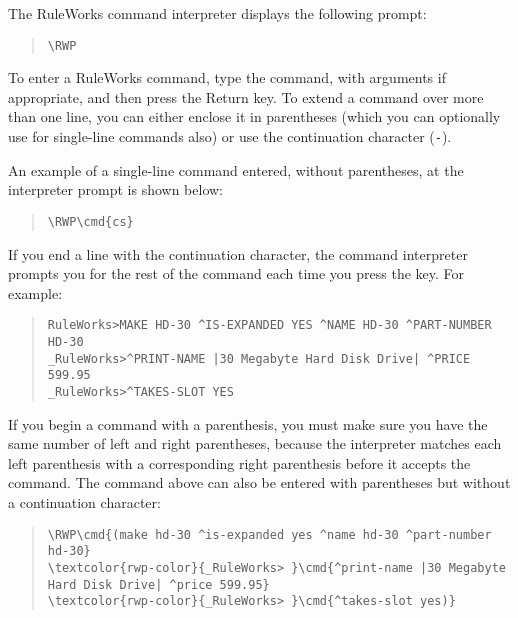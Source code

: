 The RuleWorks command interpreter displays the following prompt:

\begin{quote}
\begin{Verbatim}[commandchars=\\\{\}]
\RWP
\end{Verbatim}
\end{quote}

To enter a RuleWorks command, type the command, with arguments if
appropriate, and then press the Return key. To extend a command over
more than one line, you can either enclose it in parentheses (which
you can optionally use for single-line commands also) or use the
continuation character (\verb|-|).

An example of a single-line command entered, without parentheses, at
the interpreter prompt is shown below:

\begin{quote}
\begin{Verbatim}[commandchars=\\\{\}]
\RWP\cmd{cs}
\end{Verbatim}
\end{quote}

If you end a line with the continuation character, the command
interpreter prompts you for the rest of the command each time you
press the  key. For example:

\begin{quote}
\begin{verbatim}
RuleWorks>MAKE HD-30 ^IS-EXPANDED YES ^NAME HD-30 ^PART-NUMBER HD-30
_RuleWorks>^PRINT-NAME |30 Megabyte Hard Disk Drive| ^PRICE 599.95
_RuleWorks>^TAKES-SLOT YES
\end{verbatim}
\end{quote}

If you begin a command with a parenthesis, you must make sure you have
the same number of left and right parentheses, because the interpreter
matches each left parenthesis with a corresponding right parenthesis
before it accepts the command.  The  command above can also
be entered with parentheses but without a continuation character:

\begin{quote}
\begin{Verbatim}[commandchars=\\\{\}]
\RWP\cmd{(make hd-30 ^is-expanded yes ^name hd-30 ^part-number hd-30}
\textcolor{rwp-color}{_RuleWorks> }\cmd{^print-name |30 Megabyte Hard Disk Drive| ^price 599.95}
\textcolor{rwp-color}{_RuleWorks> }\cmd{^takes-slot yes)}
\end{Verbatim}
\end{quote}

